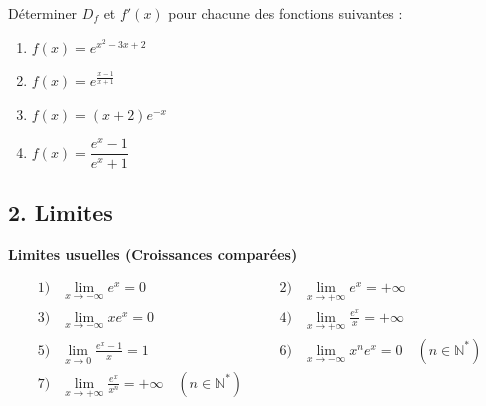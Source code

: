 \documentclass[12pt,a4paper]{article}
\begin{document}
\vspace{0.5cm}

Déterminer $D_f$ et $f'(x)$ pour chacune des fonctions suivantes :

\begin{enumerate}
    \item $f(x) = e^{x^2 - 3x + 2}$
    
    \dotfill
    
    \dotfill
    
    \dotfill
    
    \item $f(x) = e^{\frac{x - 1}{x + 1}}$
    
    \dotfill
    
    \dotfill
    
    \dotfill
    
    \item $f(x) = (x + 2)e^{-x}$
    
    \dotfill
    
    \dotfill
    
    \dotfill
    
    \item $f(x) = \dfrac{e^x - 1}{e^x + 1}$
    
    \dotfill
    
    \dotfill
    
    \dotfill
\end{enumerate}

\subsection*{\color{myred}2. Limites}

\textbf{\color{myred} Limites usuelles (Croissances comparées)}

\begin{tcolorbox}[colback=red!5!white,colframe=myred,title=\textbf{Formules des limites usuelles à retenir}]
\[
\begin{array}{rcccl}
1) & \lim_{x \to -\infty} e^x = 0 & \quad & 2) & \lim_{x \to +\infty} e^x = +\infty \\[0.3cm]
3) & \lim_{x \to -\infty} x e^x = 0 & \quad & 4) & \lim_{x \to +\infty} \frac{e^x}{x} = +\infty \\[0.3cm]
5) & \lim_{x \to 0} \frac{e^x - 1}{x} = 1 & \quad & 6) & \lim_{x \to -\infty} x^n e^x = 0 \quad (n \in \mathbb{N}^*)\\[0.3cm]
7) & \lim_{x \to +\infty} \frac{e^x}{x^n} = +\infty \quad (n \in \mathbb{N}^*)
\end{array}
\]
\end{tcolorbox}
\end{document}
